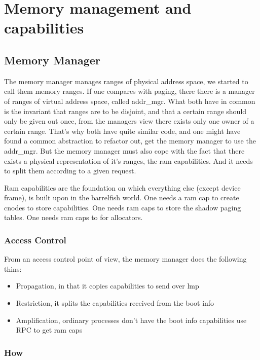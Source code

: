 \chapter{Memory management and capabilities}

\section{Memory Manager}

The memory manager manages ranges of physical address space, we started to call
them memory ranges.
If one compares with paging, there there is a manager of ranges of virtual
address space, called addr\_mgr.
What both have in common is the invariant that ranges are to be disjoint, and
that a certain range should only be given out once, from the managers view there
exists only one owner of a certain range.
That's why both have quite similar code, and one might have found a common
abstraction to refactor out, get the memory manager to use the addr\_mgr.
But the memory manager must also cope with the fact that there exists a physical
representation of it's ranges, the ram capabilities. And it needs to split them
according to a given request.

Ram capabilities are the foundation on which everything else (except device
frame), is built upon in the barrelfish world.
One needs a ram cap to create cnodes to store capabilities.
One needs ram caps to store the shadow paging tables.
One needs ram caps to for allocators.

\subsection{Access Control}

From an access control point of view, the memory manager does the following thins:
\begin{itemize}
	\item Propagation, in that it copies capabilities to send over lmp
	\item Restriction, it splits the capabilities received from the boot info
	\item Amplification, ordinary processes don't have the boot info capabilities
		 		use RPC to get ram caps
\end{itemize}

\subsection{How}

